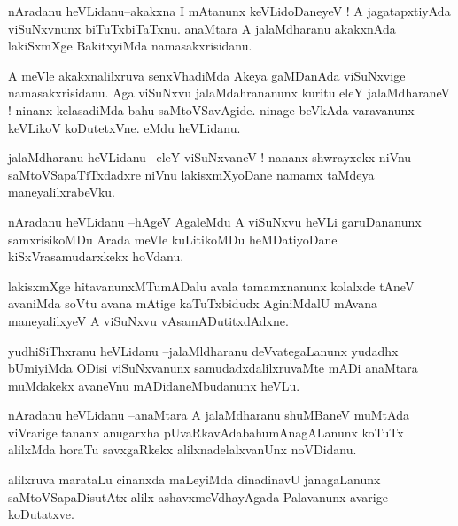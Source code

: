 \documentclass{article}
\begin{document}
\begin{mn}%
nAradanu heVLidanu--akakxna I mAtanunx keVLidoDaneyeV ! A jagatapxtiyAda viSuNxvnunx 
biTuTxbiTaTxnu. anaMtara A jalaMdharanu akakxnAda lakiSxmXge BakitxyiMda namasakxrisidanu.
\end{mn}

\begin{mn}%
A meVle akakxnalilxruva senxVhadiMda Akeya gaMDanAda viSuNxvige namasakxrisidanu. Aga 
viSuNxvu jalaMdahrananunx kuritu eleY jalaMdharaneV ! ninanx kelasadiMda bahu 
saMtoVSavAgide. ninage beVkAda varavanunx keVLikoV koDutetxVne. eMdu heVLidanu.
\end{mn}

\begin{mn}%
jalaMdharanu heVLidanu --eleY viSuNxvaneV ! nananx shwrayxekx niVnu saMtoVSapaTiTxdadxre 
niVnu lakisxmXyoDane namamx taMdeya maneyalilxrabeVku.
\end{mn}

\begin{mn}%
nAradanu heVLidanu --hAgeV AgaleMdu A viSuNxvu heVLi garuDananunx samxrisikoMDu Arada meVle 
kuLitikoMDu heMDatiyoDane kiSxVrasamudarxkekx hoVdanu.
\end{mn}

\begin{mn}%
lakisxmXge hitavanunxMTumADalu avala tamamxnanunx kolalxde tAneV avaniMda soVtu avana mAtige 
kaTuTxbidudx AginiMdalU mAvana maneyalilxyeV A viSuNxvu vAsamADutitxdAdxne.
\end{mn}

 

\begin{mn}%
yudhiSiThxranu heVLidanu --jalaMldharanu deVvategaLanunx yudadhx bUmiyiMda ODisi 
viSuNxvanunx samudadxdalilxruvaMte mADi anaMtara muMdakekx avaneVnu mADidaneMbudanunx heVLu.
\end{mn}

\begin{mn}%
nAradanu heVLidanu --anaMtara A jalaMdharanu shuMBaneV muMtAda viVrarige tananx anugarxha 
pUvaRkavAdabahumAnagALanunx koTuTx alilxMda horaTu savxgaRkekx alilxnadelalxvanUnx noVDidanu.
\end{mn}

\begin{mn}%
alilxruva marataLu cinanxda maLeyiMda dinadinavU janagaLanunx saMtoVSapaDisutAtx alilx 
ashavxmeVdhayAgada Palavanunx avarige koDutatxve.
\end{mn}
\end{document}
